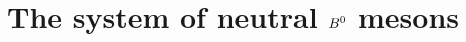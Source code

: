 
\section{The system of neutral \texorpdfstring{${{B}^0}$}{B0} mesons}
\label{sec:cpviolation:neutralBmesons}